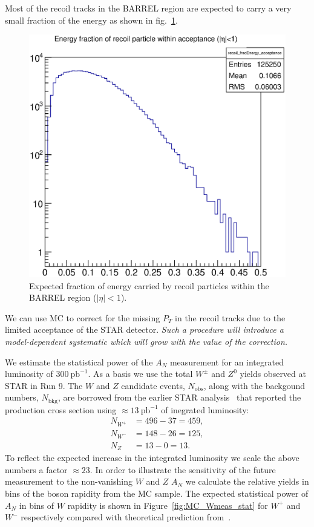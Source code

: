 \documentclass[12pt]{article}
\begin{document}
Most of the recoil tracks in the BARREL region are expected to carry a very
small fraction of the energy as shown in fig.~\ref{fig:MC_recoil_Efrac}.

\begin{figure}
\centering
\includegraphics[height=0.5\textheight]{images/recoil_energy_frac.eps}
\caption{Expected fraction of energy carried by recoil particles within the BARREL region ($|\eta|<1$).}
\label{fig:MC_recoil_Efrac} 
\end{figure}

We can use MC to correct for the missing $P_{T}$ in the recoil tracks due to
the limited acceptance of the STAR detector. \textit{Such a procedure will
introduce a model-dependent systematic which will grow with the value of the
correction.}

We estimate the statistical power of the $A_N$ measurement for an integrated
luminosity of $300~\text{pb}^{-1}$. As a basis we use the total $W^\pm$ and
$Z^0$ yields observed at STAR in Run 9. The $W$ and $Z$ candidate events,
$N_\text{obs}$, along with the backgound numbers, $N_\text{bkg}$, are borrowed
from the earlier STAR analysis~\cite{WCrossSecRun9} that reported the production
cross section using $\approx 13~\text{pb}^{-1}$ of inegrated luminosity:
%
%
\begin{align*}
N_{W^+} &= 496 - 37 = 459,\\
N_{W^-} &= 148 - 26 = 125,\\
N_Z &= 13 - 0 = 13.
\end{align*}
%
To reflect the expected increase in the integrated luminosity we scale the
above numbers a factor $\approx 23$. In order to illustrate the sensitivity of
the future measurement to the non-vanishing $W$ and $Z$ $A_N$ we calculate the
relative yields in bins of the boson rapidity from the MC sample. The expected
statistical power of $A_N$ in bins of $W$ rapidity is shown in
Figure~\ref{fig:MC_Wmeas_stat} for $W^+$ and $W^-$ respectively compared with
theoretical prediction from~\cite{Kang:2009bp}.
\end{document}
